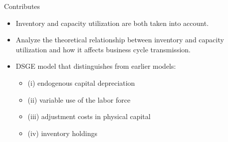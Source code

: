 \documentclass[fontset=windows,12pt,t,aspectratio=169]{beamer}
\begin{document}
\begin{frame}{Contributes}
   \begin{itemize}
     \item Inventory and capacity utilization are both taken into account.
     \vspace{5pt}
     \item Analyze the theoretical relationship between inventory and capacity utilization and how it affects business cycle transmission.
     \vspace{5pt}
     \item DSGE model that distinguishes from earlier models:
     \begin{itemize}
       \item (i) endogenous capital depreciation
       \vspace{5pt}
       \item (ii) variable use of the labor force
       \vspace{5pt}
       \item (iii) adjustment costs in physical capital
       \vspace{5pt}
       \item (iv) inventory holdings
     \end{itemize}

   \end{itemize}
\end{frame}

\end{document}
